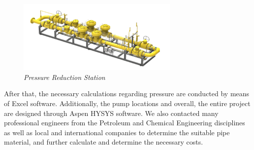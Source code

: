 \documentclass[12pt]{article}
\begin{document}
\begin{figure}[h!]
	\centering
	\includegraphics[width=0.7\textwidth]{assets/images/pressure_reduction_station.png}
	\caption{\textit{Pressure Reduction Station}}
	\label{fig:your_image}
 \end{figure}


 {\fontsize{12}{12}\selectfont 
	\hspace*{1em} After that, the necessary calculations regarding pressure are conducted by means of Excel software. Additionally, the pump locations and overall, the entire project are designed through Aspen HYSYS software.  We also contacted many professional engineers from the Petroleum and Chemical Engineering disciplines as well as local and international companies to determine the suitable pipe material, and further calculate and determine the necessary costs.
 	\\

 }

 
\end{document}
